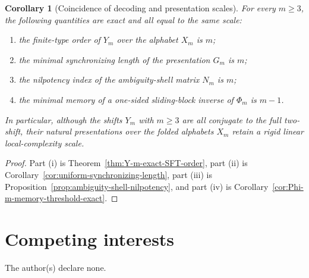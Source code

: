 \documentclass[11pt,letterpaper]{article}
\numberwithin{equation}{section}
\theoremstyle{plain}
\newtheorem{corollary}[theorem]{Corollary}
\theoremstyle{definition}
\theoremstyle{remark}
\begin{document}
\begin{corollary}[Coincidence of decoding and presentation scales]
\label{cor:local-complexity-scale-coincidence}
For every $m\ge 3$, the following quantities are exact and all equal to the
same scale:
\begin{enumerate}[label=\textup{(\roman*)}]
\item the finite-type order of $Y_m$ over the alphabet $X_m$ is $m$;
\item the minimal synchronizing length of the presentation $G_m$ is $m$;
\item the nilpotency index of the ambiguity-shell matrix $N_m$ is $m$;
\item the minimal memory of a one-sided sliding-block inverse of $\Phi_m$ is
$m-1$.
\end{enumerate}
In particular, although the shifts $Y_m$ with $m\ge 3$ are all conjugate to the
full two-shift, their natural presentations over the folded alphabets $X_m$
retain a rigid linear local-complexity scale.
\end{corollary}

\begin{proof}
Part \textup{(i)} is Theorem~\ref{thm:Y-m-exact-SFT-order},
part \textup{(ii)} is Corollary~\ref{cor:uniform-synchronizing-length},
part \textup{(iii)} is Proposition~\ref{prop:ambiguity-shell-nilpotency}, and
part \textup{(iv)} is Corollary~\ref{cor:Phi-m-memory-threshold-exact}.
\end{proof}

\section*{Competing interests}

The author(s) declare none.



\end{document}
